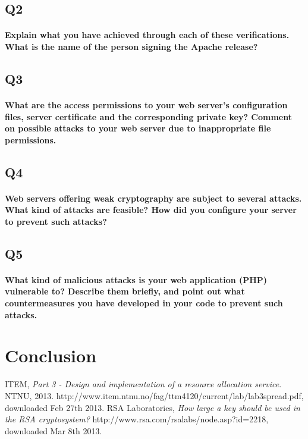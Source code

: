\documentclass[a4paper,11pt]{article}
\begin{document}
\subsection{Q2}
\paragraph{Explain what you have achieved through each of these veriﬁcations. What is the name of
the person signing the Apache release?}
\subsection{Q3}
\paragraph{What are the access permissions to your web server’s conﬁguration ﬁles, server certiﬁcate
and the corresponding private key? Comment on possible attacks to your web server due to
inappropriate ﬁle permissions.}
\subsection{Q4}
\paragraph{Web servers oﬀering weak cryptography are subject to several attacks. What kind of
attacks are feasible? How did you conﬁgure your server to prevent such attacks?}
\subsection{Q5}
\paragraph{What kind of malicious attacks is your web application (PHP) vulnerable to? Describe
them brieﬂy, and point out what countermeasures you have developed in your code to prevent
such attacks.}
\section*{Conclusion}
\begin{thebibliography}{9}
ITEM, 
	\emph{Part 3 - Design and implementation of a resource allocation service}.
	NTNU, 2013.  http://www.item.ntnu.no/fag/ttm4120/current/lab/lab3spread.pdf, downloaded Feb 27th 2013.
RSA Laboratories, \emph{How large a key should be used in the RSA cryptosystem?} http://www.rsa.com/rsalabs/node.asp?id=2218, downloaded Mar 8th 2013.	
\end{thebibliography}
\listoffigures
\end{document}
